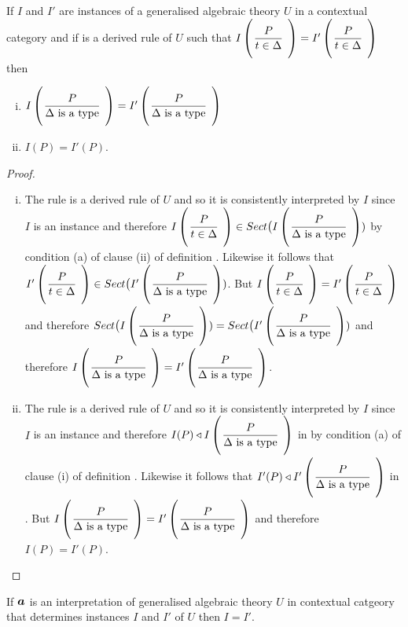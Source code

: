\begin{lemma}
If $I$ and $I'$ are instances of a generalised algebraic theory $U$ in a contextual category \catcw and if 
is a derived rule of $U$ such that $\Imap{\gatdisplayrule{P}{\ofT{t}{\Delta}}}=\Ipmap{\gatdisplayrule{P}{\ofT{t}{\Delta}}}$
then
\begin{enumerate}[(i)]
\item
$\Imap{\gatdisplayrule{P}{\isT{\Delta}}}=\Ipmap{\gatdisplayrule{P}{\isT{\Delta}}}$
\item
$I(P)=I'(P)$.
\end{enumerate}
\end{lemma}
\begin{proof}
\begin{enumerate}[(i)]
\item
The rule  is a derived rule of $U$ and so 
it is consistently interpreted by $I$ since $I$ is an instance and therefore 
$\Imap{\gatdisplayrule{P}{\ofT{t}{\Delta}}} \in Sect \big(\Imap{\gatdisplayrule{P}{\isT{\Delta}}})$ by condition (a) of clause (ii) of definition .
Likewise it follows that $\Ipmap{\gatdisplayrule{P}{\ofT{t}{\Delta}}} \in Sect \big(\Ipmap{\gatdisplayrule{P}{\isT{\Delta}}})$.
But $\Imap{\gatdisplayrule{P}{\ofT{t}{\Delta}}} = \Ipmap{\gatdisplayrule{P}{\ofT{t}{\Delta}}}$ and therefore
$Sect \big(\Imap{\gatdisplayrule{P}{\isT{\Delta}}})=Sect \big(\Ipmap{\gatdisplayrule{P}{\isT{\Delta}}})$
and therefore $\Imap{\gatdisplayrule{P}{\isT{\Delta}}}=\Ipmap{\gatdisplayrule{P}{\isT{\Delta}}}$.
\item
The rule  is a derived rule of $U$ and so 
it is consistently interpreted by $I$ since $I$ is an instance and therefore 
$I(P) \base \Imap{\gatdisplayrule{P}{\isT{\Delta}}}$ in \catcw by condition (a) of clause (i) of definition  . 
Likewise it follows that  $I'(P) \base \Ipmap{\gatdisplayrule{P}{\isT{\Delta}}}$ in \catc. 
But $\Imap{\gatdisplayrule{P}{\isT{\Delta}}} = \Ipmap{\gatdisplayrule{P}{\isT{\Delta}}}$ and therefore $I(P)=I'(P)$. 
\end{enumerate}
\end{proof}
\begin{lemma} 
If $\iI$ is an interpretation of generalised algebraic theory $U$ in contextual catgeory \catcw that determines instances $I$ and $I'$ of $U$ then
$I=I'$. 
\end{lemma}
